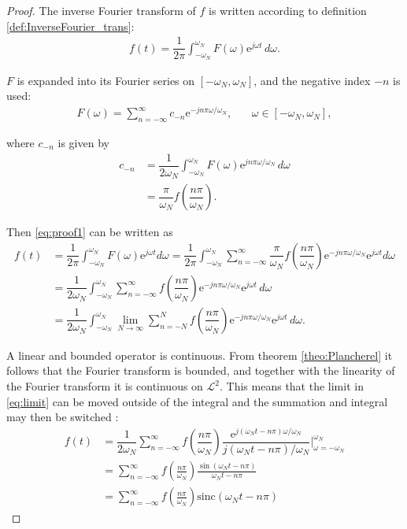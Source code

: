 \begin{proof}
The inverse Fourier transform of $f$ is written according to definition \ref{def:InverseFourier_trans}:
\begin{align} \label{eq:proof1}
f(t) = \dfrac{1}{2\pi} \int_{-\omega_N}^{\omega_N} \! F(\omega)\mathrm{e}^{j\omega t} \, d\omega.
\end{align}

$F$ is expanded into its Fourier series on $[-\omega_N,\omega_N]$, and the negative index $-n$ is used:
\begin{align*}
F(\omega) = \sum_{n=-\infty}^{\infty} c_{-n} \mathrm{e}^{-jn\pi\omega/\omega_N}, \phantom{mm} \omega \in [-\omega_N,\omega_N],
\end{align*}

where $c_{-n}$ is given by
\begin{align*}
c_{-n} &= \dfrac{1}{2\omega_N} \int_{-\omega_N}^{\omega_N} \!F(\omega) \mathrm{e}^{jn\pi\omega/\omega_N} \, d\omega \\
&= \dfrac{\pi}{\omega_N} f \left( \dfrac{n\pi}{\omega_N}\right).
\end{align*}

Then \eqref{eq:proof1} can be written as
\begin{align} \label{eq:limit}
f(t) &= \dfrac{1}{2\pi} \int_{-\omega_N}^{\omega_N} F(\omega) \mathrm{e}^{j\omega t} d\omega = \dfrac{1}{2\pi} \int_{-\omega_N}^{\omega_N} \sum_{n=-\infty}^{\infty} \dfrac{\pi}{\omega_N} f \left( \dfrac{n\pi}{\omega_N}\right) \mathrm{e}^{-jn\pi\omega/\omega_N} \mathrm{e}^{j\omega t} d\omega \nonumber \\
&= \dfrac{1}{2\omega_N} \int_{-\omega_N}^{\omega_N} \! \sum_{n=-\infty}^{\infty} f \left( \dfrac{n\pi}{\omega_N} \right) \mathrm{e}^{-jn\pi\omega/\omega_N} \mathrm{e}^{j\omega t} \, d\omega
\nonumber \\
&= \dfrac{1}{2\omega_N} \int_{-\omega_N}^{\omega_N} \! \lim_{N\to\infty} \sum_{n=-N}^{N} f \left( \dfrac{n\pi}{\omega_N} \right) \mathrm{e}^{-jn\pi\omega/\omega_N} \mathrm{e}^{j\omega t} \, d\omega.
\end{align}

A linear and bounded operator is continuous. From theorem \ref{theo:Plancherel} it follows that the Fourier transform is bounded, and together with the linearity of the Fourier transform it is continuous on $\mathcal{L}^2$. This means that the limit in \eqref{eq:limit} can be moved outside of the integral and the summation and integral may then be switched \cite{FAA}:
\begin{align*}
f(t) &= \dfrac{1}{2\omega_N} \sum_{n=-\infty}^{\infty} f \left( \dfrac{n\pi}{\omega_N} \right) \dfrac{\mathrm{e}^{j(\omega_N t - n\pi)\omega/\omega_N}}{j(\omega_Nt - n\pi)/\omega_N}\Bigg|_{\omega=-\omega_N}^{\omega_N}
\\
&=\sum_{n=-\infty}^{\infty}f\left(\frac{n\pi}{\omega_N}\right)\frac{\sin(\omega_Nt-n\pi)}{\omega_Nt-n\pi}
\\
&=\sum_{n=-\infty}^{\infty}f\left(\frac{n\pi}{\omega_N}\right)\mathrm{sinc}(\omega_Nt-n\pi)
\end{align*}
\end{proof}

